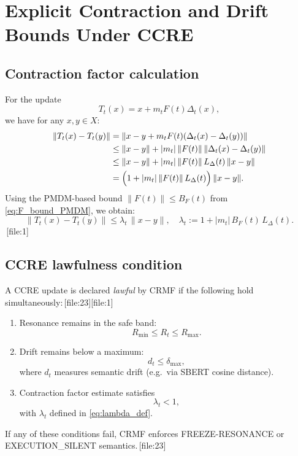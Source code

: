 \documentclass[11pt]{article}
\begin{document}
\section{Explicit Contraction and Drift Bounds Under CCRE}

\subsection{Contraction factor calculation}

For the update
\[
  T_t(x) = x + m_t F(t)\Delta_t(x),
\]
we have for any $x,y\in X$:
\begin{align*}
  \|T_t(x) - T_t(y)\|
  &= \|x-y + m_t F(t)(\Delta_t(x) - \Delta_t(y))\| \\
  &\le \|x-y\| + |m_t|\,\|F(t)\|\,\|\Delta_t(x) - \Delta_t(y)\| \\
  &\le \|x-y\| + |m_t|\,\|F(t)\|\,L_\Delta(t)\,\|x-y\| \\
  &= \Bigl(1 + |m_t|\,\|F(t)\|\,L_\Delta(t)\Bigr)\,\|x-y\|.
\end{align*}
Using the PMDM-based bound $\|F(t)\|\le B_F(t)$ from \eqref{eq:F_bound_PMDM}, we obtain:
\begin{equation}
  \|T_t(x) - T_t(y)\| \le \lambda_t\,\|x-y\|,\quad
  \lambda_t := 1 + |m_t|\,B_F(t)\,L_\Delta(t).\label{eq:lambda_def}
\end{equation}
\,[file:1]

\subsection{CCRE lawfulness condition}

A CCRE update is declared \emph{lawful} by CRMF if the following hold simultaneously:\,[file:23][file:1]
\begin{enumerate}[leftmargin=1.5em]
  \item Resonance remains in the safe band:
  \[
    R_{\min} \le R_t \le R_{\max}.
  \]
  \item Drift remains below a maximum:
  \[
    d_t \le \delta_{\max},
  \]
  where $d_t$ measures semantic drift (e.g.\ via SBERT cosine distance).
  \item Contraction factor estimate satisfies
  \[
    \lambda_t < 1,
  \]
  with $\lambda_t$ defined in \eqref{eq:lambda_def}.
\end{enumerate}
If any of these conditions fail, CRMF enforces FREEZE-RESONANCE or EXECUTION\_SILENT semantics.\,[file:23]
\end{document}
